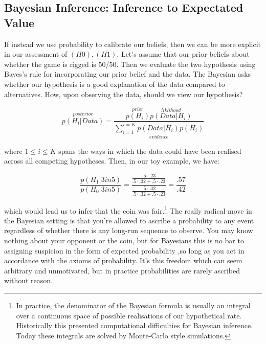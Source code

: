 \documentclass{tufte-handout}
\begin{document}
\subsection{Bayesian Inference: Inference to Expectated Value}
If instead we use probability to calibrate our beliefs, then we can be more explicit in our assessment of $(H0), (H1)$. Let's assume that our prior beliefs about whether the game is rigged is 50/50. Then we evaluate the two hypothesis using Bayes's rule for incorporating our prior belief and the data. The Bayesian asks whether our hypothesis is a good explanation of the data compared to alternatives. How, upon observing the data, should we view our hypothesis?

$$ \overset{posterior}{p(H_{i} | Data)} = \frac{\overset{prior}{p(H_{i})}\overset{liklihood}{p(Data | H_{i})}}{\underset{evidence}{\sum_{i=1}^{i =K} p(Data | H_{i})p(H_i)}}$$

where $ 1 \leq i \leq K$ spans the ways in which the data could have been realised across all competing hypotheses. Then, in our toy example, we have:

$$ \frac{p(H_1 | 3 in 5)}{p(H_{0} | 3 in 5)} = \frac{\frac{.5\cdot .23}{.5\cdot .32 + .5 \cdot .23}}{\frac{.5\cdot .32}{.5\cdot .32 + .5 \cdot .23}} = \frac{.57}{.42} $$

which would lead us to infer that the coin was fair.\footnote{In practice, the denominator of the Bayesian formula is usually an integral over a continuous space of possible realisations of our hypothetical rate. Historically this presented computational difficulties for Bayesian inference. Today these integrals are solved by Monte-Carlo style simulations.} The really radical move in the Bayesian setting is that you're allowed to ascribe a probability to any event regardless of whether there is any long-run sequence to observe. You may know nothing about your opponent or the coin, but for Bayesians this is no bar to assigning suspicion in the form of expected probability ,so long as you act in accordance with the axioms of probability. It's this freedom which can seem arbitrary and unmotivated, but in practice probabilities  are rarely ascribed without reason.
\end{document}

